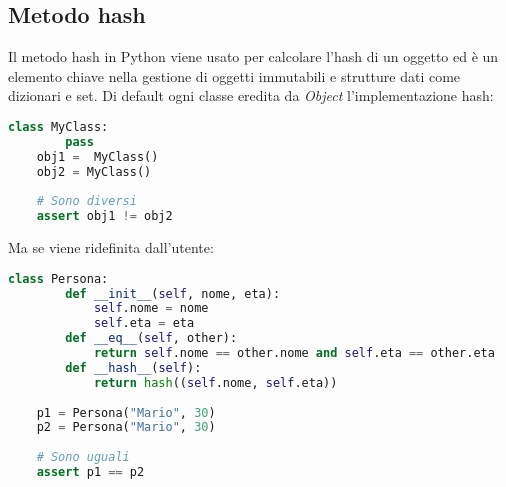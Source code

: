 \subsection{Metodo hash}
Il metodo hash in Python viene usato per calcolare l'hash di un oggetto ed è un elemento chiave nella gestione di oggetti immutabili e strutture dati come dizionari e set. Di default ogni classe eredita da \textit{Object} l'implementazione hash:
\begin{lstlisting}[language=Python]
	class MyClass:
		pass
	obj1 =  MyClass()
	obj2 = MyClass()
	
	# Sono diversi
	assert obj1 != obj2
\end{lstlisting}
Ma se viene ridefinita dall'utente:
\begin{lstlisting}[language=Python]
	class Persona:
		def __init__(self, nome, eta):
			self.nome = nome
			self.eta = eta
		def __eq__(self, other):
			return self.nome == other.nome and self.eta == other.eta
		def __hash__(self):
			return hash((self.nome, self.eta))
	
	p1 = Persona("Mario", 30)
	p2 = Persona("Mario", 30)
	
	# Sono uguali
	assert p1 == p2
\end{lstlisting}

